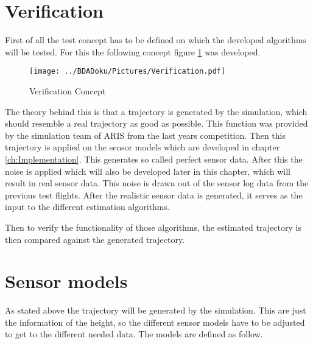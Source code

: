 % 
%   
 
  
  \section{Verification}
  First of all the test concept has to be defined on which the developed algorithms will be tested.
  For this the following concept figure \ref{fig:Verification} was developed.
  
  \begin{figure}[h!]
   \centering
   \texttt{[image: ../BDADoku/Pictures/Verification.pdf]}
   \caption{Verification Concept}
   \label{fig:Verification}
  \end{figure}

  The theory behind this is that a trajectory is generated by the simulation, which should resemble a real trajectory as good as possible.
  This function was provided by the simulation team of ARIS from the last years competition.
  Then this trajectory is applied on the sensor models which are developed in chapter \ref{ch:Implementation}.
  This generates so called perfect sensor data. 
  After this the noise is applied which will also be developed later in this chapter, which will result in real sensor data. 
  This noise is drawn out of the sensor log data from the previous test flights.
  After the realistic sensor data is generated, it serves as the input to the different estimation algorithms.
  
  Then to verify the functionality of those algorithms, the estimated trajectory is then compared against the generated trajectory.
  
  
  \section{Sensor models}
  As stated above the trajectory will be generated by the simulation. 
  This are just the information of the height, so the different sensor models have to be adjusted to get to the different needed data.
  The models are defined as follow.
  
